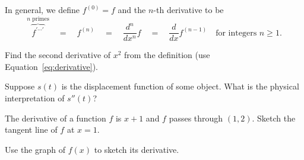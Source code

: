 \documentclass[../main.tex]{subfiles}
\begin{document}
\label{page:higher-derivatives}
In general, we define \(f^{(0)} = f\) and the \(n\)-th derivative to be
\[
  \overbrace{f^{' \cdots '}}^{\text{\(n\) primes}} \quad=\quad f^{(n)} \quad=\quad \frac{d^{n}}{dx^{n}} f \quad=\quad \frac{d}{dx} f^{(n-1)} \quad\text{for integers } n \ge 1.
\]

\begin{example}
  Find the second derivative of \(x^{2}\) from the definition (use Equation~\eqref{eq:derivative}).

\end{example}

\begin{example}
  Suppose \(s(t)\) is the displacement function of some object. What is the physical interpretation of \(s''(t)\)?

\end{example}
\clearpage

\begin{example}
  The derivative of a function \(f\) is \(x+1\) and \(f\) passes through \((1, 2)\). Sketch the tangent line of \(f\) at \(x = 1\). 

  
\end{example}

\begin{example}
  Use the graph of \(f(x)\) to sketch its derivative. 

  \begin{center}
    

    
  \end{center}
\end{example}
\end{document}
